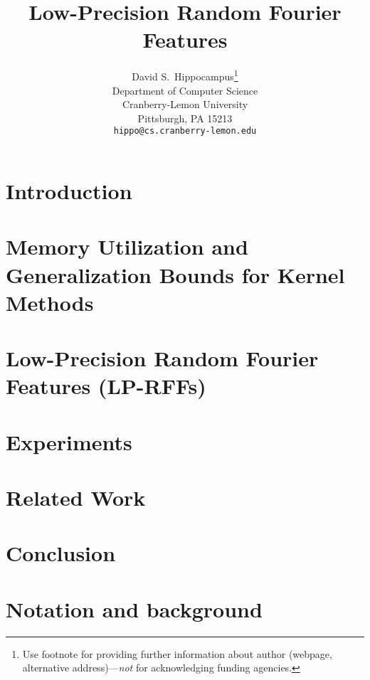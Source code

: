 \documentclass{article}
\title{Low-Precision Random Fourier Features}
\author{
  David S.~Hippocampus\thanks{Use footnote for providing further
    information about author (webpage, alternative
    address)---\emph{not} for acknowledging funding agencies.} \\
  Department of Computer Science\\
  Cranberry-Lemon University\\
  Pittsburgh, PA 15213 \\
  \texttt{hippo@cs.cranberry-lemon.edu} \\
}
\begin{document}

\maketitle

\begin{abstract}

\end{abstract}

\section{Introduction}
\label{sec:intro}


\section{Memory Utilization and Generalization Bounds for Kernel Methods}
\label{sec:prelim}


\section{Low-Precision Random Fourier Features (LP-RFFs)}
\label{sec:lprff}


\section{Experiments}
\label{sec:experiments}


\section{Related Work}
\label{sec:relwork}


\section{Conclusion}
\label{sec:conclusion}




%

%

\clearpage

\appendix

\section{Notation and background}
\label{sec:background_appendix}

\end{document}
